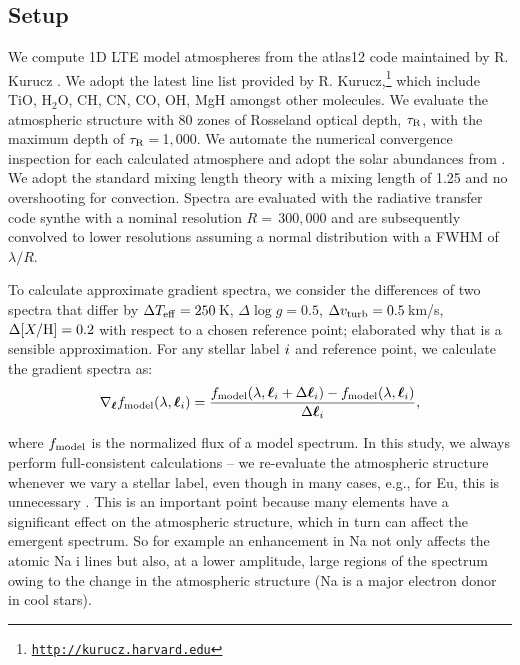 \documentclass[iop]{emulateapj}
\newcommand{\set}[1]{\bm{#1}}
\newcommand{\starlabel}{\ell}
\newcommand{\labels}{\set{\starlabel}}
\begin{document}
\begin{CJK*}{UTF8}{gbsn}
\subsection{Setup}

We compute 1D LTE model atmospheres from the {\sc atlas12} code maintained by R. Kurucz \citep{kur70,kur81,kur93}. We adopt the latest line list provided by R. Kurucz,\footnote{\href{http://kurucz.harvard.edu}{\tt http://kurucz.harvard.edu}} which include TiO, H$_2$O, CH, CN, CO, OH, MgH amongst other molecules. We evaluate the atmospheric structure with 80 zones of Rosseland optical depth, $\tau_{\rm R}$, with the maximum depth of $\tau_{\rm R}= \,$1$,$000. We automate the numerical convergence inspection for each calculated atmosphere and adopt the solar abundances from \citet{asp09}. We adopt the standard mixing length theory with a mixing length of 1.25 and no overshooting for convection. Spectra are evaluated with the radiative transfer code {\sc synthe} with a nominal resolution $R = \,$300$,$000 and are subsequently convolved to lower resolutions assuming a normal distribution with a FWHM of $\lambda/R$. 

To calculate approximate gradient spectra, we consider the differences of two spectra that differ by $\Delta T_{\rm eff} = 250\,$K, $\Delta \log g = 0.5$, $\Delta v_{\rm turb} = 0.5\,$km/s, $\Delta [X/{\rm H}] = 0.2$ with respect to a chosen reference point; \citet{tin16} elaborated why that is a sensible approximation. For any stellar label $\label_i$ and reference point, we calculate the gradient spectra as:
\begin{equation}
\nabla_{\labels} f_{\rm model} (\lambda,\labels_i) = \frac{f_{\rm model} (\lambda, \labels_i + \Delta \labels_i) - f_{\rm model} (\lambda, \labels_i)}{\Delta \labels_i},
\label{eq:gradient-calculation}
\end{equation}

\noindent
where $f_{\rm model}$ is the normalized flux of a model spectrum. In this study, we always perform full-consistent calculations -- we re-evaluate the atmospheric structure whenever we vary a stellar label, even though in many cases, e.g., for Eu, this is unnecessary \citep[see][for details]{tin16}. This is an important point because many elements have a significant effect on the atmospheric structure, which in turn can affect the emergent spectrum.  So for example an enhancement in Na not only affects the atomic Na {\sc i} lines but also, at a lower amplitude, large regions of the spectrum owing to the change in the atmospheric structure (Na is a major electron donor in cool stars).   


\end{CJK*}
\end{document}
